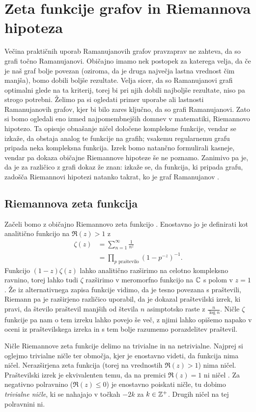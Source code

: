 \section{Zeta funkcije grafov in Riemannova hipoteza}
Večina praktičnih uporab Ramanujanovih grafov pravzaprav ne zahteva, da so grafi točno Ramanujanovi. Običajno imamo nek postopek za katerega velja, da če je naš graf bolje povezan (oziroma, da je druga največja lastna vrednost čim manjša), bomo dobili boljše rezultate. Velja sicer, da so Ramanujanovi grafi optimalni glede na ta kriterij, torej bi pri njih dobili najboljše rezultate, niso pa strogo potrebni. Želimo pa si ogledati primer uporabe ali lastnosti Ramanujanovih grafov, kjer bi bilo zares ključno, da so grafi Ramanujanovi. Zato si bomo ogledali eno izmed najpomembnejših domnev v matematiki, Riemannovo hipotezo. Ta opisuje obnašanje ničel določene kompleksne funkcije, vendar se izkaže, da obstaja analog te funkcije na grafih; vsakemu regularnemu grafu pripada neka kompleksna funkcija. Izrek bomo natančno formulirali kasneje, vendar pa dokaza običajne Riemannove hipoteze še ne poznamo. Zanimivo pa je, da je za različico z grafi dokaz že znan: izkaže se, da funkcija, ki pripada grafu, zadošča Riemannovi hipotezi natanko takrat, ko je graf Ramanujanov \cite{portablesnowbird}.

\subsection{Riemannova zeta funkcija}
Začeli bomo z običajno Riemannovo zeta funkcijo \cite{freitag1}. Enostavno jo je definirati kot analitično funkcijo na \(\Re(z)>1\) z
\begin{align*}
    \zeta(z) &= \sum_{n=1}^\infty \frac{1}{n^z} \\ 
    &= \prod_{p \text{ praštevilo}} \left(1-p^{-z}\right)^{-1}.
\end{align*}
Funkcijo \((1-z)\zeta(z)\) lahko analitično razširimo na celotno kompleksno ravnino, torej lahko tudi \(\zeta\) razširimo v meromorfno funkcijo na \(\mathbb C\) s polom v \(z=1\). Že iz alternativnega zapisa funkcije vidimo, da je tesno povezana s praštevili, Riemann pa je razširjeno različico uporabil, da je dokazal praštevilski izrek, ki pravi, da število praštevil manjših od števila \(n\) asimptotsko raste z \(\frac{n}{\log{n}}\). Ničle \(\zeta\) funkcije pa nam o tem izreku lahko povejo še več, z njimi lahko opišemo napako v oceni iz praštevilskega izreka in s tem bolje razumemo porazdelitev praštevil.

Ničle Riemannove zeta funkcije delimo na trivialne in na netrivialne. Najprej si oglejmo trivialne ničle ter območja, kjer je enostavno videti, da funkcija nima ničel. Nerazširjena zeta funkcija (torej na vrednostih \(\Re(z) > 1\)) nima ničel. Praštevilski izrek je ekvivalenten temu, da na premici \(\Re(z) = 1\) ni ničel \cite{harolddiamond}. Za negativno polravnino (\(\Re(z) \leq 0\)) je enostavno poiskati ničle, tu dobimo \emph{trivialne ničle}, ki se nahajajo v točkah \(-2k\) za \(k\in\mathbb Z^+\). Drugih ničel na tej polravnini ni.

